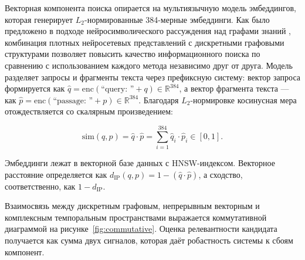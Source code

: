 Векторная компонента поиска опирается на мультиязычную модель эмбеддингов, которая генерирует $\displaystyle L_2$-нормированные 384-мерные эмбеддинги. Как было предложено в подходе нейросимволического рассуждения над графами знаний \cite{ref4}, комбинация плотных нейросетевых представлений с дискретными графовыми структурами позволяет повысить качество информационного поиска по сравнению с использованием каждого метода независимо друг от друга. Модель разделяет запросы и фрагменты текста через префиксную систему: вектор запроса формируется как $\displaystyle \hat{q} = \text{enc}(\text{``query: ''} + q) \in \mathbb{R}^{384}$, а вектор фрагмента текста — как $\displaystyle \hat{p} = \text{enc}(\text{``passage: ''} + p) \in \mathbb{R}^{384}$. Благодаря $\displaystyle L_2$-нормировке косинусная мера отождествляется со скалярным произведением:

\begin{equation}
    \text{sim}(q, p) = \hat{q} \cdot \hat{p} = \sum_{i=1}^{384} \hat{q}_i \cdot \hat{p}_i \in [0, 1].
    \label{eq:cosine_sim}
\end{equation}

Эмбеддинги лежат в векторной базе данных с HNSW-индексом. Векторное расстояние определяется как $\displaystyle d_{\text{IP}}(q, p) = 1 - (\hat{q} \cdot \hat{p})$, а сходство, соответственно, как $\displaystyle 1 - d_{\text{IP}}$. 

Взаимосвязь между дискретным графовым, непрерывным векторным и комплексным темпоральным пространствами выражается коммутативной диаграммой на рисунке~\ref{fig:commutative}. Оценка релевантности кандидата получается как сумма двух сигналов, которая даёт робастность системы к сбоям компонент.

